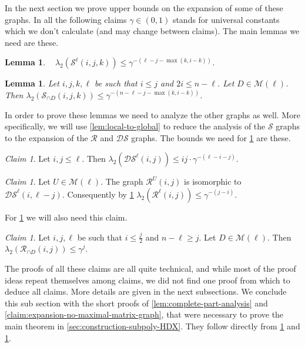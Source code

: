\documentclass[10pt,a4paper]{article}
\newcommand{\prettyref}[1]{\cref{#1}}
\newtheorem{lemma}[theorem]{Lemma}
\theoremstyle{definition}
\theoremstyle{remark}
\newtheorem{claim}[theorem]{Claim}
\renewcommand{\leq}{\leqslant}
\renewcommand{\geq}{\geqslant}
\numberwithin{equation}{section}
\let\pref=\prettyref
\def\MP{\mathcal{M}}
\begin{document}
In the next section we prove upper bounds on the expansion of some of these graphs. In all the following claims \(\gamma \in (0,1)\) stands for universal constants which we don't calculate (and may change between claims). The main lemmas we need are these. 
\begin{lemma} \label{lem:expansion-of-S-upper-loc}~
    \(\lambda_2(\mathcal{S}^{\ell}(i,j,k)) \leq \gamma^{-(\ell-j-\max(k,i-k))}\).
\end{lemma}

\begin{lemma} \label{lem:expansion-of-S-lower-loc}
    Let \(i,j,k,\ell\) be such that \(i \leq j\) and \(2i \leq n-\ell\). Let \(D \in \MP(\ell)\). Then \(\lambda_2(\mathcal{S}_{\cap D}(i,j,k)) \leq \gamma^{-(n-\ell-j-\max(k,i-k))}\).
\end{lemma}

In order to prove these lemmas we need to analyze the other graphs as well. More specifically, we will use \pref{lem:local-to-global} to reduce the analysis of the \(\mathcal{S}\) graphs to the expansion of the \(\mathcal{R}\) and \(\mathcal{DS}\) graphs. The bounds we need for \pref{lem:expansion-of-S-upper-loc} are these.
\begin{claim} \label{claim:upper-local-ds-bound}
    Let \(i,j \leq \ell\). Then
    \(\lambda_2(\mathcal{DS}^{\ell}(i,j)) \leq i j \cdot \gamma^{-(\ell-i-j)}\).
\end{claim}

\begin{claim} \label{claim:upper-local-R-bound}
    Let \(U \in \MP(\ell)\). The graph \(\mathcal{R}^{U}(i,j)\) is isomorphic to \(\mathcal{DS}^{\ell}(i,\ell-j)\). Consequently by \pref{claim:upper-local-ds-bound}
    \(\lambda_2(\mathcal{R}^{\ell}(i,j)) \leq \gamma^{-(j-i)}\).
\end{claim}

For \pref{lem:expansion-of-S-lower-loc} we will also need this claim.
\begin{claim} \label{claim:lower-R-bound}
    Let \(i,j,\ell\) be such that \(i \leq \frac{j}{2}\) and \(n-\ell \geq j\). Let \(D \in \MP(\ell)\). Then \(\lambda_2(\mathcal{R}_{\cap D}(i,j)) \leq \gamma^{j}\).
\end{claim}

The proofs of all these claims are all quite technical, and while most of the proof ideas repeat themselves among claims, we did not find one proof from which to deduce all claims. More details are given in the next subsections. We conclude this sub section with the short proofs of \pref{lem:complete-part-analysis} and \pref{claim:expansion-no-maximal-matrix-graph}, that were necessary to prove the main theorem in \pref{sec:construction-subpoly-HDX}. They follow directly from \pref{lem:expansion-of-S-upper-loc} and \pref{lem:expansion-of-S-lower-loc}.
\end{document}
